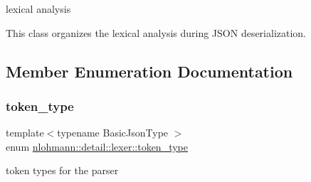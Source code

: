 lexical analysis 

This class organizes the lexical analysis during J\+S\+ON deserialization. 

\subsection{Member Enumeration Documentation}
\mbox{\label{classnlohmann_1_1detail_1_1lexer_a3f313cdbe187cababfc5e06f0b69b098}} 
\subsubsection{\texorpdfstring{token\+\_\+type}{token\_type}}
{\footnotesize\ttfamily template$<$typename Basic\+Json\+Type $>$ \\
enum \mbox{\hyperlink{classnlohmann_1_1detail_1_1lexer_a3f313cdbe187cababfc5e06f0b69b098}{nlohmann\+::detail\+::lexer\+::token\+\_\+type}}\hspace{0.3cm}{\ttfamily [strong]}}



token types for the parser 

